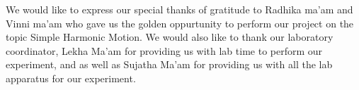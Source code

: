 We would like to express our special thanks of gratitude to Radhika ma'am and Vinni ma'am who gave us the golden oppurtunity to perform our project on the topic Simple Harmonic Motion. We would also like to thank our laboratory coordinator, Lekha Ma'am for providing us with lab time to perform our experiment, and as well as Sujatha Ma'am for providing us with all the lab apparatus for our experiment.

